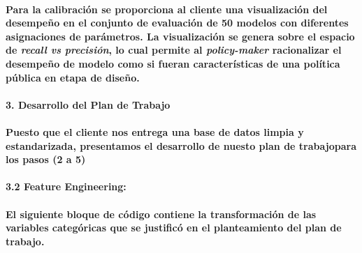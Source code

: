 \documentclass[]{article}
\let\oldparagraph\paragraph
\renewcommand{\paragraph}[1]{\oldparagraph{#1}\mbox{}}
\begin{document}
\begin{itemize}
  \paragraph{\texorpdfstring{Para la \textbf{calibración} se proporciona
  al cliente una visualización del desempeño en el conjunto de
  evaluación de 50 modelos con diferentes asignaciones de parámetros. La
  visualización se genera sobre el espacio de \emph{recall vs
  precisión}, lo cual permite al \emph{policy-maker} racionalizar el
  desempeño de modelo como si fueran características de una política
  pública en etapa de
  diseño.}{Para la calibración se proporciona al cliente una visualización del desempeño en el conjunto de evaluación de 50 modelos con diferentes asignaciones de parámetros. La visualización se genera sobre el espacio de recall vs precisión, lo cual permite al policy-maker racionalizar el desempeño de modelo como si fueran características de una política pública en etapa de diseño.}}\label{para-la-calibracion-se-proporciona-al-cliente-una-visualizacion-del-desempeno-en-el-conjunto-de-evaluacion-de-50-modelos-con-diferentes-asignaciones-de-parametros.-la-visualizacion-se-genera-sobre-el-espacio-de-recall-vs-precision-lo-cual-permite-al-policy-maker-racionalizar-el-desempeno-de-modelo-como-si-fueran-caracteristicas-de-una-politica-publica-en-etapa-de-diseno.}
\end{itemize}

\paragraph{\texorpdfstring{\textbf{3. Desarrollo del Plan de Trabajo
}}{3. Desarrollo del Plan de Trabajo }}\label{desarrollo-del-plan-de-trabajo}

\paragraph{Puesto que el cliente nos entrega una base de datos limpia y
estandarizada, presentamos el desarrollo de nuesto plan de trabajopara
los pasos (2 a
5)}\label{puesto-que-el-cliente-nos-entrega-una-base-de-datos-limpia-y-estandarizada-presentamos-el-desarrollo-de-nuesto-plan-de-trabajopara-los-pasos-2-a-5}

\paragraph{3.2 Feature Engineering:}\label{feature-engineering}

\paragraph{El siguiente bloque de código contiene la transformación de
las variables categóricas que se justificó en el planteamiento del plan
de
trabajo.}\label{el-siguiente-bloque-de-codigo-contiene-la-transformacion-de-las-variables-categoricas-que-se-justifico-en-el-planteamiento-del-plan-de-trabajo.}
\end{document}
